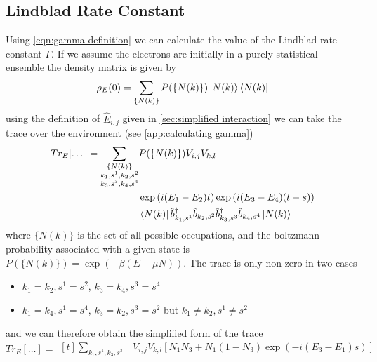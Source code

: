 \subsection{Lindblad Rate Constant}
Using \cref{eqn:gamma definition}
we can calculate the value of
the Lindblad rate constant \(\Gamma \).
If we assume the electrons
are initially in a purely
statistical ensemble the
density matrix is given
by\cite{sakurai_napolitano_2020}
\begin{equation}
    \rho_E(0) = \sum_{\{N(k)\}}
    P(\{N(k)\})
    \ket{N(k)} \bra{N(k)}
\end{equation}
using the definition
of \(\hat{E}_{i,j}\) given
in \cref{sec:simplified interaction}
we can
take the trace over the
environment (see \cref{app:calculating gamma})
\begin{equation}
    Tr_E[\dots]  = \begin{aligned}[t]
        \sum_{\substack{\{N(k)\}                             \\
        k_1,s^1,k_2,s^2                                      \\
                k_3,s^3,k_4,s^4 }}
         & P(\{N(k)\}) V_{i,j} V_{k,l}                       \\
         & \exp{(i(E_1 - E_2) t)} \exp{(i(E_3 - E_4) (t-s))} \\
         & \bra{N(k)}
        \hat{b}_{k_1,s^1}^\dagger{} \hat{b}_{k_2,s^2}
        \hat{b}_{k_3,s^3}^\dagger{} \hat{b}_{k_4,s^4}
        \ket{N(k)}
    \end{aligned}
\end{equation}
where \( \{N(k)\} \) is the set of
all possible occupations, and
the boltzmann
probability associated with a
given state is
\(P(\{N(k)\}) = \exp{(-\beta{}(E-\mu N))}\).
The trace is only non zero in two
cases
\begin{itemize}
    \item \(k_1=k_2, s^1=s^2\),
          \(k_3=k_4, s^3=s^4\)
    \item \(k_1=k_4, s^1=s^4\),
          \(k_3=k_2, s^3=s^2\) but
          \(k_1\neq{}k_2, s^1\neq{}s^2\)
\end{itemize}
and we can therefore obtain the
simplified form of the trace
\begin{equation}
    Tr_E[\dots] = \begin{aligned}[t]
        \sum_{k_1,s^1,k_3,s^3 }
         & V_{i,j} V_{k,l} [
                N_1 N_3
                + N_1 (1 - N_3) \exp{(-i(E_3 - E_1)s)}]
    \end{aligned}
\end{equation}
